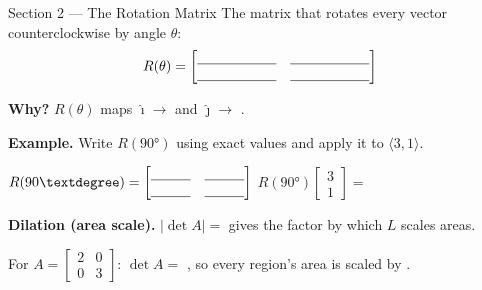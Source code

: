 \documentclass[10pt]{article}
\begin{document}
\begin{notesbox}{Section 2 --- The Rotation Matrix}
\small
The matrix that rotates every vector counterclockwise by angle $\theta$:
\[
  R(\theta) = \begin{bmatrix} \blank{2cm} & \blank{2cm} \\ \blank{2cm} & \blank{2cm} \end{bmatrix}
\]

\textbf{Why?} $R(\theta)$ maps $\hat{\imath} \to $ \blank{3cm} and $\hat{\jmath} \to $ \blank{3cm}.

\vspace{0.08in}
\textbf{Example.} Write $R(90°)$ using exact values and apply it to $\langle3,1\rangle$.

\hspace{1em} $R(90°) = \begin{bmatrix} \blank{1cm} & \blank{1cm} \\ \blank{1cm} & \blank{1cm} \end{bmatrix}$
\qquad $R(90°)\begin{bmatrix}3\\1\end{bmatrix} = $ \blank{4cm}

\vspace{0.08in}
\textbf{Dilation (area scale).} $|\det A| = $ \blank{2cm} gives the factor by which $L$ scales areas.

\hspace{1em} For $A = \begin{bmatrix}2&0\\0&3\end{bmatrix}$: \; $\det A = $ \blank{1.2cm},
so every region's area is scaled by \blank{1.2cm}.
\end{notesbox}

\vspace{0.06in}
\end{document}

